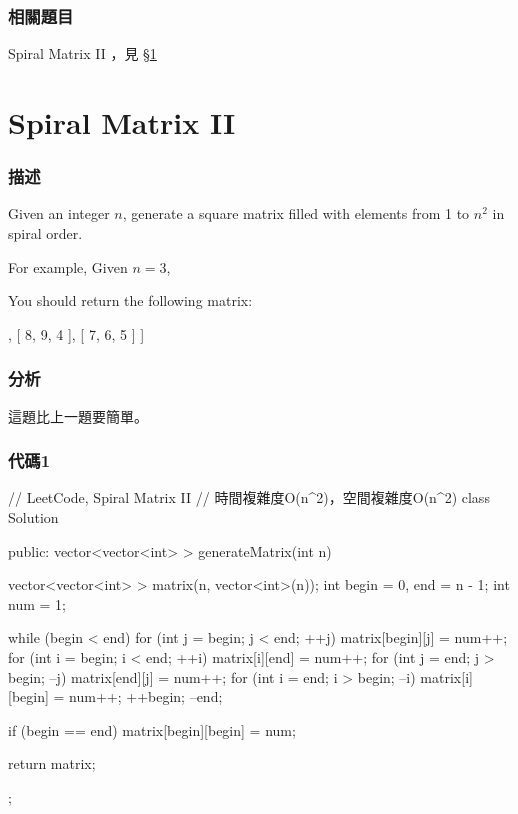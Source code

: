 \subsubsection{相關題目}
\begindot
\item Spiral Matrix II ，見 \S \ref{sec:spiral-matrix-ii}
\myenddot


\section{Spiral Matrix II} %
\label{sec:spiral-matrix-ii}


\subsubsection{描述}
Given an integer $n$, generate a square matrix filled with elements from 1 to $n^2$ in spiral order.

For example,
Given $n = 3$,

You should return the following matrix:
\begin{Code}
[
 [ 1, 2, 3 ],
 [ 8, 9, 4 ],
 [ 7, 6, 5 ]
]
\end{Code}


\subsubsection{分析}
這題比上一題要簡單。


\subsubsection{代碼1}
\begin{Code}
// LeetCode, Spiral Matrix II
// 時間複雜度O(n^2)，空間複雜度O(n^2)
class Solution {
public:
    vector<vector<int> > generateMatrix(int n) {
        vector<vector<int> > matrix(n, vector<int>(n));
        int begin = 0, end = n - 1;
        int num = 1;

        while (begin < end) {
            for (int j = begin; j < end; ++j) matrix[begin][j] = num++;
            for (int i = begin; i < end; ++i) matrix[i][end] = num++;
            for (int j = end; j > begin; --j) matrix[end][j] = num++;
            for (int i = end; i > begin; --i) matrix[i][begin] = num++;
            ++begin;
            --end;
        }

        if (begin == end) matrix[begin][begin] = num;

        return matrix;
    }
};
\end{Code}


